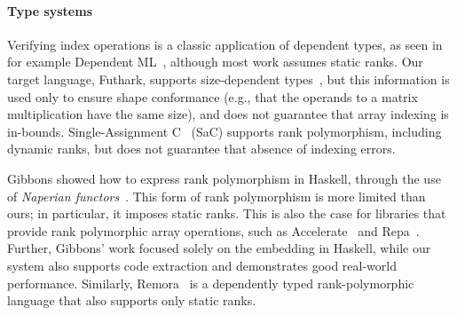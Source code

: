 \paragraph{Type systems}

Verifying index operations is a classic application of dependent types, as seen
in for example Dependent ML~\cite{10.1145/292540.292560}, although most work
assumes static ranks. Our target language, Futhark, supports size-dependent
types~\cite{10.1145/3609024.3609412}, but this information is used only to
ensure shape conformance (e.g., that the operands to a matrix multiplication
have the same size), and does not guarantee that array indexing is in-bounds.
Single-Assignment C~\cite{sac2} (SaC) supports rank polymorphism, including
dynamic ranks, but does not guarantee that absence of indexing errors.

Gibbons showed how to express rank polymorphism in Haskell, through the use of
\emph{Naperian functors}~\cite{10.1145/2976022.2976023}. This form of rank
polymorphism is more limited than ours; in particular, it imposes static ranks.
This is also the case for libraries that provide rank polymorphic array
operations, such as Accelerate~\cite{10.1145/1926354.1926358} and
Repa~\cite{10.1145/1932681.1863582}. Further, Gibbons' work focused solely on
the embedding in Haskell, while our system also supports code extraction and
demonstrates good real-world performance. Similarly, Remora~\cite{rank-poly} is
a dependently typed rank-polymorphic language that also supports only static
ranks.
